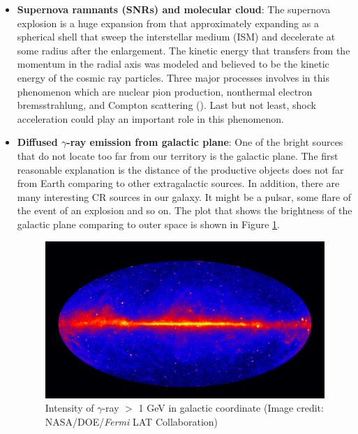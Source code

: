 \begin{itemize}
    \item \textbf{Supernova ramnants (SNRs) and molecular cloud}: 
    The supernova explosion is a huge expansion from that approximately
    expanding as a spherical shell that sweep the interstellar medium (ISM)
    and decelerate at some radius after the enlargement. The kinetic energy that transfers from the momentum in the radial axis was modeled and believed to be the kinetic energy of the cosmic ray particles.
    Three major processes involves in this phenomenon which 
    are nuclear pion production, nonthermal electron bremsstrahlung, and Compton scattering
    (\cite{cr_from_snr_2013}). Last but not least, shock acceleration could play an important role in this phenomenon.

    \item \textbf{Diffused $\gamma$-ray emission from galactic plane}:
    One of the bright sources that do not locate too far from our territory is the galactic plane. The first reasonable explanation is the distance of the productive objects does not far from Earth comparing 
    to other extragalactic sources. In addition, there are many interesting 
    CR sources in our galaxy. It might be a pulsar, some flare of the event of an explosion and so on. The plot that shows the brightness
    of the galactic plane comparing to outer space is shown in 
    Figure \ref{fig:gamma_galac_plane}.

    \begin{figure}[h!]
        \centering
        \includegraphics[width=\textwidth]{content/background/figures/Fermi_5_years.jpg}
        \caption{Intensity of $\gamma$-ray $>$ 1 GeV in galactic coordinate (Image credit: NASA/DOE/\textit{Fermi} LAT Collaboration)}
        \label{fig:gamma_galac_plane}
    \end{figure}


\end{itemize}
